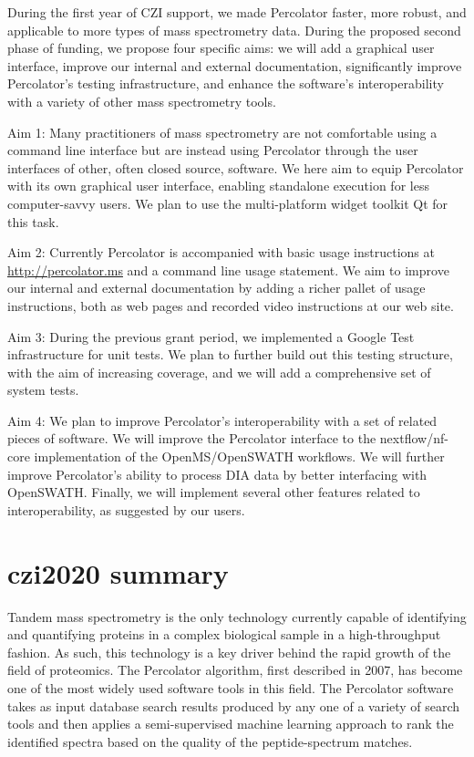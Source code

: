 \documentclass{article}
\begin{document}
During the first year of CZI support, we made Percolator faster, more
robust, and applicable to more types of mass spectrometry data. During
the proposed second phase of funding, we propose four specific aims:
we will add a graphical user interface, improve our internal and
external documentation, significantly improve Percolator's testing
infrastructure, and enhance the software's interoperability with a
variety of other mass spectrometry tools.

Aim 1: Many practitioners of mass spectrometry are not comfortable
using a command line interface but are instead using Percolator
through the user interfaces of other, often closed source, software.
We here aim to equip Percolator with its own graphical user interface,
enabling standalone execution for less computer-savvy users. We plan
to use the multi-platform widget toolkit Qt for this task.

Aim 2: Currently Percolator is accompanied with basic usage
instructions at \url{http://percolator.ms} and a command line usage
statement. We aim to improve our internal and external documentation
by adding a richer pallet of usage instructions, both as web pages and
recorded video instructions at our web site.

Aim 3: During the previous grant period, we implemented a Google Test
infrastructure for unit tests. We plan to further build out this
testing structure, with the aim of increasing coverage, and we will add
a comprehensive set of system tests.

Aim 4: We plan to improve Percolator's interoperability with a set of
related pieces of software. We will improve the Percolator interface
to the nextflow/nf-core implementation of the OpenMS/OpenSWATH
workflows.  We will further improve Percolator's ability to process
DIA data by better interfacing with OpenSWATH.  Finally, we will
implement several other features related to interoperability, as
suggested by our users.

\section*{czi2020 summary}
Tandem mass spectrometry is the only technology currently capable of
identifying and quantifying proteins in a complex biological sample in
a high-throughput fashion. As such, this technology is a key driver
behind the rapid growth of the field of proteomics.  The Percolator
algorithm, first described in 2007, has become one of the most widely
used software tools in this field.  The Percolator software takes as
input database search results produced by any one of a variety of
search tools and then applies a semi-supervised machine learning
approach to rank the identified spectra based on the quality of the
peptide-spectrum matches.
\end{document}
